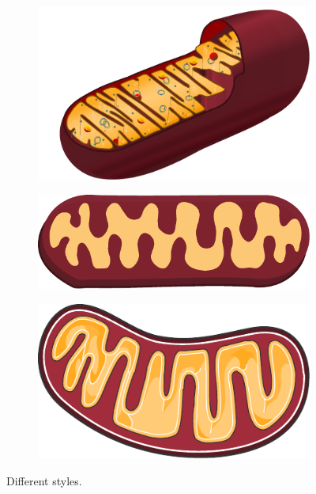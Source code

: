 \begin{figure}[h]
    \centering
    \begin{subfigure}[t]{0.3\linewidth}
        \includegraphics[width=\textwidth]{chapters/images/animal_mitochondrion}
    \end{subfigure}
    \begin{subfigure}[t]{0.3\linewidth}
        \includegraphics[width=\textwidth]{chapters/images/mitochondrium-rod}
    \end{subfigure}
    \begin{subfigure}[t]{0.3\linewidth}
        \includegraphics[width=\textwidth]{chapters/images/mitochondrium-servier}
    \end{subfigure}
    \caption{Different styles.}
    \label{fig:diff-styles}
\end{figure}
